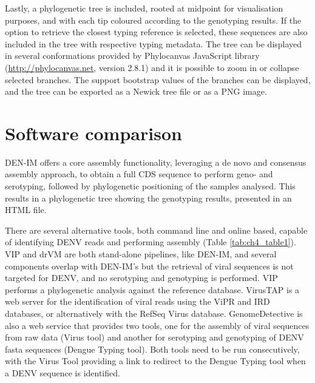 Lastly, a phylogenetic tree is included, rooted at midpoint for visualisation purposes, and with each tip coloured according to the genotyping results. If the option to retrieve the closest typing reference is selected, these sequences are also included in the tree with respective typing metadata. The tree can be displayed in several conformations provided by Phylocanvas JavaScript library (\url{http://phylocanvas.net}, version 2.8.1) and it is possible to zoom in or collapse selected branches. The support bootstrap values of the branches can be displayed, and the tree can be exported as a Newick tree file or as a PNG image.

\section{Software comparison}

DEN-IM offers a core assembly functionality, leveraging a de novo and consensus assembly approach, to obtain a full CDS sequence to perform geno- and serotyping, followed by phylogenetic positioning of the samples analysed. This results in a phylogenetic tree showing the genotyping results, presented in an HTML file.

There are several alternative tools, both command line and online based, capable of identifying DENV reads and performing assembly (Table \ref{tab:ch4_table1}). VIP and drVM are both stand-alone pipelines, like DEN-IM, and several components overlap with DEN-IM’s but the retrieval of viral sequences is not targeted for DENV, and no serotyping and genotyping is performed. VIP performs a phylogenetic analysis against the reference database. VirusTAP is a web server for the identification of viral reads using the ViPR and IRD databases, or alternatively with the RefSeq Virus database. GenomeDetective is also a web service that provides two tools, one for the assembly of viral sequences from raw data (Virus tool) and another for serotyping and genotyping of DENV fasta sequences (Dengue Typing tool). Both tools need to be run consecutively, with the Virus Tool providing a link to redirect to the Dengue Typing tool when a DENV sequence is identified.


